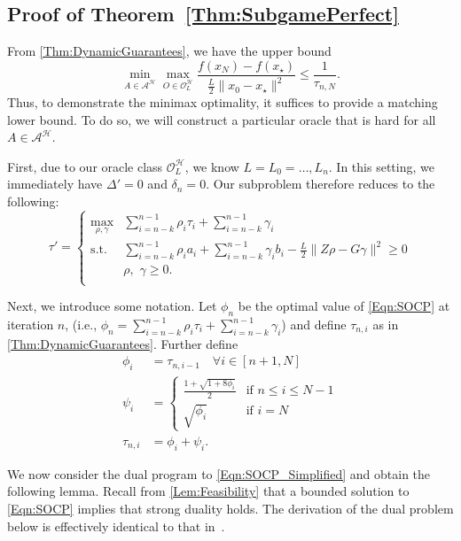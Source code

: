 \documentclass[11pt]{article}
\numberwithin{equation}{section}
\newcommand{\Ucoef}{\rho}
\newcommand{\Wcoef}{\gamma}
\newcommand{\idxMem}{k}
\newcommand{\ip}[2]{\sum_{i={n-\idxMem}}^{n-1} {#1}_i {#2}_i}
\newcommand{\fullSum}[1]{\sum_{i={n-\idxMem}}^{n-1} {#1}_i}
\newcommand{\norm}[1]{\|{#1}\|}
\theoremstyle{definition}
\theoremstyle{plain}
\theoremstyle{definition}
\begin{document}
\subsection{Proof of Theorem~\ref{Thm:SubgamePerfect}} \label{SubSec:SubgamePerfectProof}

From \cref{Thm:DynamicGuarantees}, we have the upper bound
\begin{equation}
    \min_{A\in \mathcal{A}^\mathcal{H}} \max_{O \in\mathcal{O}_L^\mathcal{H}} \frac{f(x_N)-f(x_\star)}{\frac{L}{2}\|x_0-x_\star\|^2} \leq \frac{1}{\tau_{n,N}}.
\end{equation}
Thus, to demonstrate the minimax optimality, it suffices to provide a matching lower bound.
To do so, we will construct a particular oracle that is hard for all $A\in \mathcal{A}^\mathcal{H}$.

First, due to our oracle class $\mathcal{O}_L^\mathcal{H}$, we know $L = L_0 = \dots, L_n$. In this setting, we immediately have $\Delta' = 0$ and $\delta_n = 0$.
Our subproblem therefore reduces to the following:
\begin{equation} \label{Eqn:SOCP_Simplified}
    \tau' = \left\{\begin{array}{ll}
            \max_{\Ucoef, \Wcoef} & \ip{\Ucoef}{\tau} + \fullSum{\Wcoef} \\
            \text{s.t.} & \ip{\Ucoef}{a} + \ip{\Wcoef}{b} - \frac{L}{2} \norm{Z \Ucoef - G \Wcoef}^2 \geq 0 \\
            & \Ucoef, \, \, \Wcoef \geq 0. \\
            \end{array} \right.
\end{equation}


Next, we introduce some notation. Let $\phi_n$ be the optimal value of \eqref{Eqn:SOCP} at iteration $n$, (i.e., $\phi_n = \ip{\Ucoef}{\tau} + \fullSum{\Wcoef}$) and define $\tau_{n,i}$ as in \cref{Thm:DynamicGuarantees}. Further define
\begin{align*}
    \phi_i &= \tau_{n,i-1} \quad \forall i \in [n+1,N] \\
        \psi_i &= \begin{cases} \frac{1 + \sqrt{1+8\phi_i}}{2} & \text{if } n \leq i \leq N-1 \\ \sqrt{\phi_i} & \text{if } i=N
    \end{cases} \\
    \tau_{n,i} &= \phi_i + \psi_i.
\end{align*}

We now consider the dual program to \eqref{Eqn:SOCP_Simplified} and obtain the following lemma. Recall from \cref{Lem:Feasibility} that a bounded solution to \eqref{Eqn:SOCP} implies that strong duality holds. The derivation of the dual problem below is effectively identical to that in~\cite[Lemma 3]{SPGM}.
\end{document}

